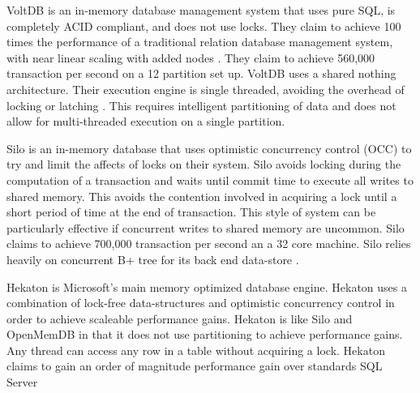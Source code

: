 \documentclass[conference, compsoc]{IEEEtran}
\begin{document}
VoltDB is an in-memory database management system that uses pure SQL, is completely ACID
compliant, and does not use locks. They claim to achieve 100 times the performance of 
a traditional relation database management system, with near linear scaling with added nodes \cite{voltdb2010voltdb}. They claim to achieve 560,000 transaction per second on a 12
partition set up. 
VoltDB uses a shared nothing architecture. Their execution engine is single threaded, 
avoiding the overhead of locking or latching \cite{voltdb2010voltdb}. This requires
intelligent partitioning of data and does not allow for multi-threaded execution 
on a single partition. 

Silo is an in-memory database that uses optimistic concurrency control (OCC) to try and 
limit the affects of locks on their system. Silo avoids locking during the computation
of a transaction and waits until commit time to execute all writes to shared memory.
This avoids the contention involved in acquiring a lock until a short period of time 
at the end of transaction. This style of system can be particularly effective if
concurrent writes to shared memory are uncommon. Silo claims to achieve 700,000
transaction per second an a 32 core machine. Silo relies heavily on concurrent 
B+ tree for its back end data-store \cite{tu2013speedy}. 

Hekaton is Microsoft's main memory optimized database engine.
Hekaton uses a combination of lock-free data-structures and optimistic concurrency control
in order to achieve scaleable performance gains. Hekaton is like Silo and OpenMemDB in that 
it does not use partitioning to achieve performance gains. Any thread can access any 
row in a table without acquiring a lock\cite{diaconu2013hekaton}. Hekaton claims to gain
an order of magnitude performance gain over standards SQL Server\cite{diaconu2013hekaton}

\end{document}
